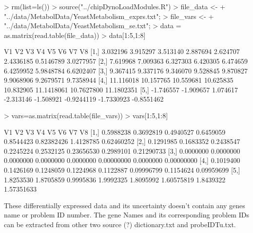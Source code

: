 \documentclass[11pt, a4paper, oneside]{article}
\begin{document}
\begin{Schunk}
\begin{Sinput}
> rm(list=ls())
> source("../chipDynoLoadModules.R")
> file_data <- 
+   "../data/MetabolData/YeastMetabolism_exprs.txt";
> file_vars <- 
+   "../data/MetabolData/YeastMetabolism_se.txt";
> data = as.matrix(read.table(file_data))
> data[1:5,1:8]
\end{Sinput}
\begin{Soutput}
            V1        V2        V3        V4        V5         V6         V7         V8
[1,]  3.032196  3.915297  3.513140  2.887694  2.624707  2.4336185  0.5146789  3.0277957
[2,]  7.619968  7.009363  6.327303  6.420305  6.474659  6.4259952  5.9848784  6.6202407
[3,]  9.367415  9.337176  9.346070  9.528845  9.870827  9.9068906  9.2679571  9.7358944
[4,] 11.116018 10.157765 10.559681 10.625835 10.832905 11.1418061 10.7627800 11.1802351
[5,] -1.746557 -1.909657  1.074617 -2.313146 -1.508921 -0.9244119 -1.7330923 -0.8551462
\end{Soutput}
\begin{Sinput}
> vars=as.matrix(read.table(file_vars))
> vars[1:5,1:8]
\end{Sinput}
\begin{Soutput}
            V1        V2        V3        V4        V5         V6        V7         V8
[1,] 0.5988238 0.3692819 0.4940527 0.6459059 0.8544423 0.82382426 1.4128785 0.62460252
[2,] 0.1291985 0.1683352 0.2438547 0.2245224 0.2532125 0.23656530 0.2989101 0.21290733
[3,] 0.0000000 0.0000000 0.0000000 0.0000000 0.0000000 0.00000000 0.0000000 0.00000000
[4,] 0.1019400 0.1426169 0.1248059 0.1224968 0.1122887 0.09996799 0.1154624 0.09959699
[5,] 1.8253530 1.8705859 0.9995836 1.9992325 1.8095992 1.60575819 1.8439322 1.57351633
\end{Soutput}
\end{Schunk}

These differentially expressed data and its uncertainty doesn't contain any genes name or problem ID number. The gene Names and its corresponding  problem IDs can be extracted from other two source (?) dictionary.txt and probeIDTu.txt.

\begin{Schunk}
\end{Schunk}
\end{document}
